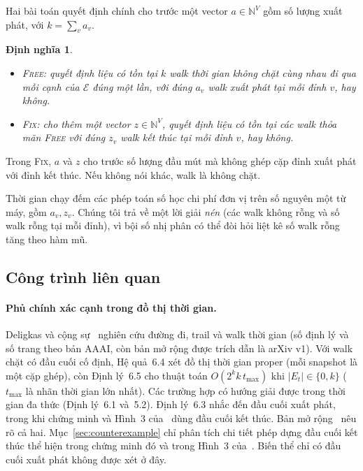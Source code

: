 \documentclass[pdflatex,sn-mathphys-num]{sn-jnl}
\theoremstyle{thmstyleone}
\theoremstyle{thmstyletwo}
\theoremstyle{thmstylethree}
\newtheorem{definition}{Định nghĩa}
\newcommand{\N}{\mathbb{N}}
\newcommand{\cE}{\mathcal{E}}
\newcommand{\FIX}{\textup{\textsc{Fix}}}
\newcommand{\FREE}{\textup{\textsc{Free}}}
\begin{document}
Hai bài toán quyết định chính cho trước một vector $a\in\N^V$ gồm số lượng xuất phát, với $k=\sum_v a_v$.

\begin{definition}\label{def:problems}
\begin{itemize}
\item \FREE{}: quyết định liệu có tồn tại $k$ walk thời gian không chặt cùng nhau đi qua mỗi cạnh của $\cE$ đúng một lần, với đúng $a_v$ walk xuất phát tại mỗi đỉnh $v$, hay không.
\item \FIX{}: cho thêm một vector $z\in\N^V$, quyết định liệu có tồn tại các walk thỏa mãn \FREE{} với đúng $z_v$ walk kết thúc tại mỗi đỉnh $v$, hay không.
\end{itemize}
\end{definition}

Trong \FIX{}, $a$ và $z$ cho trước số lượng đầu mút mà không ghép cặp đỉnh xuất phát với đỉnh kết thúc. Nếu không nói khác, walk là không chặt.

Thời gian chạy đếm các phép toán số học chi phí đơn vị trên số nguyên một từ máy, gồm $a_v,z_v$. Chúng tôi trả về một lời giải \emph{nén} (các walk không rỗng và số walk rỗng tại mỗi đỉnh), vì bội số nhị phân có thể đòi hỏi liệt kê số walk rỗng tăng theo hàm mũ.

\subsection{Công trình liên quan}\label{sec:related}

\paragraph{Phủ chính xác cạnh trong đồ thị thời gian.}
Deligkas và cộng sự~\cite{deligkas2025} nghiên cứu đường đi, trail và walk thời gian (số định lý và số trang theo bản AAAI, còn bản mở rộng được trích dẫn là arXiv v1). Với walk chặt có đầu cuối cố định, Hệ quả~6.4 xét đồ thị thời gian proper (mỗi snapshot là một cặp ghép), còn Định lý~6.5 cho thuật toán $O(2^k k\,t_{\max})$ khi $|E_t|\in\{0,k\}$ ($t_{\max}$ là nhãn thời gian lớn nhất). Các trường hợp có hướng giải được trong thời gian đa thức (Định lý~6.1 và~5.2). Định lý~6.3 nhắc đến đầu cuối xuất phát, trong khi chứng minh và Hình~3 của~\cite{deligkas2025} dùng đầu cuối kết thúc. Bản mở rộng~\cite{deligkas2024arxiv} nêu rõ cả hai. Mục~\ref{sec:counterexample} chỉ phân tích chi tiết phép dựng đầu cuối kết thúc thể hiện trong chứng minh đó và trong Hình~3 của~\cite{deligkas2025}. Biến thể chỉ có đầu cuối xuất phát không được xét ở đây.
\end{document}
